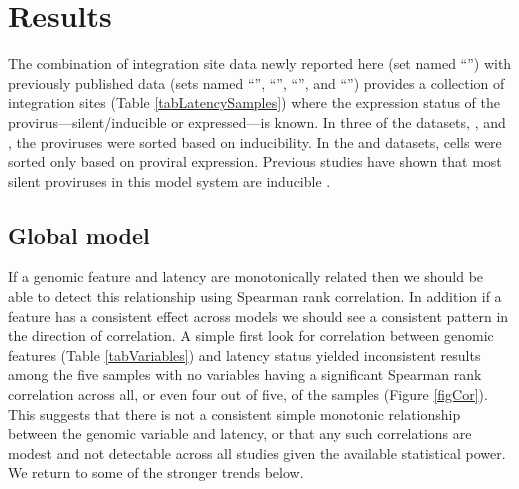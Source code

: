 \documentclass[../sherrill-Mix_thesis.tex]{subfiles}
\begin{document}
\section{Results}
	The combination of integration site data newly reported here (set named ``\Memory{}'') with previously published data (sets named ``\Jurkat{}'', ``\Bcl{}'', ``\Active{}'', and ``\Resting{}'') provides a collection of \nSites{} integration sites (Table \ref{tabLatencySamples}) where the expression status of the provirus---silent/inducible or expressed---is known. In three of the datasets, \Jurkat{}, \Memory{} and \Bcl{}, the proviruses were sorted based on inducibility. In the \Resting{} and \Active{} datasets, cells were sorted only based on proviral expression. Previous studies have shown that most silent proviruses in this model system are inducible \citep{Plesa2007}.

	\subsection{Global model}
		If a genomic feature and latency are monotonically related then we should be able to detect this relationship using Spearman rank correlation. In addition if a feature has a consistent effect across models we should see a consistent pattern in the direction of correlation. A simple first look for correlation between genomic features (Table \ref{tabVariables}) and latency status yielded inconsistent results among the five samples with no variables having a significant Spearman rank correlation across all, or even four out of five, of the samples (Figure \ref{figCor}). This suggests that there is not a consistent simple monotonic relationship between the genomic variable and latency, or that any such correlations are modest and not detectable across all studies given the available statistical power. We return to some of the stronger trends below.
\end{document}
